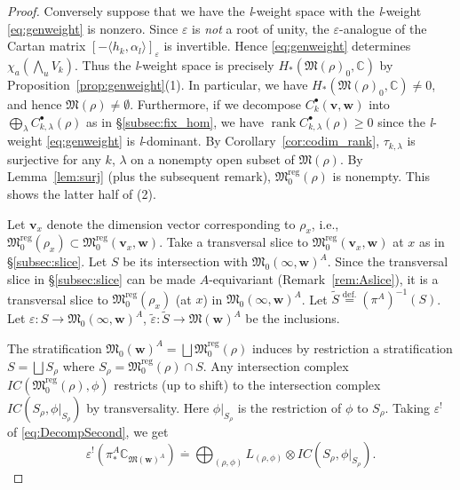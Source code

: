 \documentclass[12pt]{amsart}
\def\Bbb{\mathbb}
\def\frak{\mathfrak}
\theoremstyle{definition}
\theoremstyle{remark}
\numberwithin{equation}{subsection}
\newcommand{\lemref}[1]{Lemma~\ref{#1}}
\newcommand{\propref}[1]{Proposition~\ref{#1}}
\newcommand{\corref}[1]{Corollary~\ref{#1}}
\newcommand{\subsecref}[1]{\S\ref{#1}}
\newcommand{\remref}[1]{Remark~\ref{#1}}
\newcommand{\defeq}{\overset{\operatorname{\scriptstyle def.}}{=}}
\newcommand{\C}{{\Bbb C}}
\newcommand{\rank}{\operatorname{rank}}
\newcommand{\M}{{\frak M}} %
\newcommand{\Mreg}{{\frak M_0^{\operatorname{reg}}}}
\newcommand{\bv}{{\mathbf v}} %
\newcommand{\bw}{{\mathbf w}} %
\newcommand{\Wedge}{{\textstyle \bigwedge}}
\newcommand{\Mw}{\M(\bw)}
\newcommand{\ngpiso}{\overset{.}{=}}
\begin{document}
\begin{proof}
Conversely suppose that we have the {\it l\/}-weight space with the
{\it l\/}-weight \eqref{eq:genweight} is nonzero. Since $\varepsilon$
is {\it not\/} a root of unity, the $\varepsilon$-analogue of the
Cartan matrix $[-\langle h_k,\alpha_l\rangle]_\varepsilon$ is
invertible. Hence \eqref{eq:genweight} determines $\chi_a(\Wedge_{u}
V_k)$. Thus the {\it l\/}-weight space is precisely
$H_*(\M(\rho)_0,\C)$ by \propref{prop:genweight}(1). In particular, we
have $H_*(\M(\rho)_0,\C)\neq 0$, and hence $\M(\rho)\neq\emptyset$.
Furthermore, if we decompose $C_k^\bullet(\bv,\bw)$ into
$\bigoplus_\lambda C_{k,\lambda}^\bullet(\rho)$ as in
\subsecref{subsec:fix_hom}, we have \( \rank
C_{k,\lambda}^\bullet(\rho) \ge 0 \) since the {\it l\/}-weight
\eqref{eq:genweight} is {\it l\/}-dominant.  By
\corref{cor:codim_rank}, $\tau_{k,\lambda}$ is surjective for any $k$,
$\lambda$ on a nonempty open subset of $\M(\rho)$. By
\lemref{lem:surj} (plus the subsequent remark), $\Mreg(\rho)$ is
nonempty. This shows the latter half of (2).

Let $\bv_x$ denote the dimension vector corresponding to $\rho_x$,
i.e., $\Mreg(\rho_x)\subset \Mreg(\bv_x,\bw)$. Take a transversal
slice to $\Mreg(\bv_x,\bw)$ at $x$ as in \subsecref{subsec:slice}.
Let $S$ be its intersection with $\M_0(\infty,\bw)^A$. Since the
transversal slice in \subsecref{subsec:slice} can be made
$A$-equivariant (\remref{rem:Aslice}), it is a transversal slice to
$\Mreg(\rho_x)$ (at $x$) in $\M_0(\infty,\bw)^A$. Let $\widetilde S
\defeq (\pi^A)^{-1}(S)$.
Let $\varepsilon\colon S\to
\M_0(\infty,\bw)^A$, $\widetilde\varepsilon \colon \widetilde S\to
\Mw^A$ be the inclusions.

The stratification
$\M_0(\bw)^A = \bigsqcup \Mreg(\rho)$
induces by restriction a stratification
$S = \bigsqcup S_\rho$ where $S_\rho =
\Mreg(\rho)\cap S$.
Any intersection complex $IC(\Mreg(\rho),\phi)$
restricts (up to shift) to the intersection complex
$IC(S_\rho,\phi|_{S_\rho})$ by transversality. Here $\phi|_{S_\rho}$
is the restriction of $\phi$ to $S_{\rho}$. Taking $\varepsilon^!$ of
\eqref{eq:DecompSecond}, we get
\begin{equation}\label{eq:DecompFourth}
   \varepsilon^! \left(\pi^A_*\C_{\M(\bw)^A}\right)
   \ngpiso \bigoplus_{(\rho,\phi)} L_{(\rho,\phi)}\otimes 
   IC(S_\rho,\phi|_{S_\rho}).
\end{equation}


\end{proof}
\end{document}
